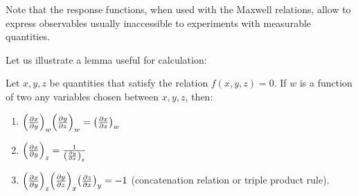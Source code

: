 \documentclass[../main/main.tex]{subfiles}
\begin{document}
\begin{remark}
Note that the response functions, when used with the Maxwell relations, allow to express observables usually inaccessible to experiments with measurable quantities.
\end{remark}


Let us illustrate a lemma useful for calculation:

\begin{orangebox}
\begin{lemma}
  \label{th:2_1}
Let \(x,y,z  \)  be quantities that satisfy the relation \( f(x,y,z)=0 \). If \( w \)  is a function of  two any variables chosen between  \(x,y,z  \), then:
\begin{enumerate}
\item \( \qty(\pdv{x}{y} )_w \qty(\pdv{y}{z} )_w = \qty(\pdv{x}{z} )_w   \)
\item \( \qty(\pdv{x}{y} )_z = \frac{1}{\qty(\pdv{y}{x} )_z }  \)
\item \( \qty(\pdv{x}{y} )_z \qty(\pdv{y}{z} )_x  \qty(\pdv{z}{x} )_y = -1    \)  (concatenation relation or triple product rule).
\end{enumerate}
\end{lemma}
\end{orangebox}
\end{document}
